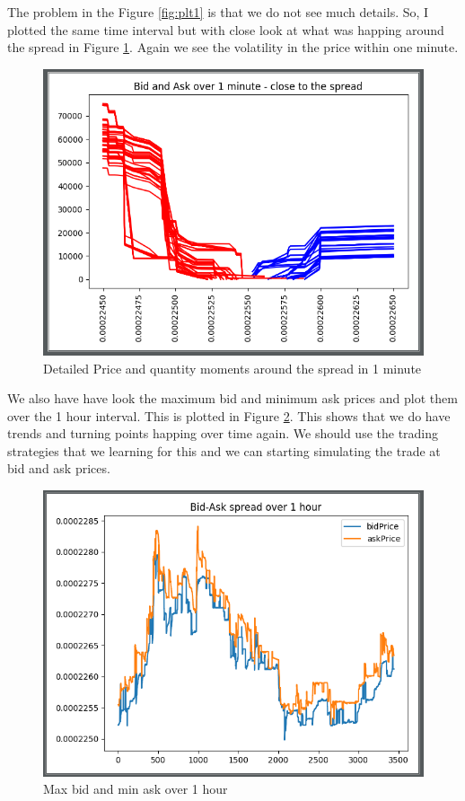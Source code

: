 \documentclass[12pt]{article}
\begin{document}
The problem in the Figure \ref{fig:plt1} is that we do not see much details. So, I plotted the same time interval but with close look at what was happing around the spread in Figure \ref{fig:plt2}. Again we see the volatility in the price within one minute.

\begin{figure}[h!]
	\centering
  \includegraphics[scale=0.5]{plot2.png}
  \caption{Detailed Price and quantity moments around the spread in 1 minute}
  \label{fig:plt2}
\end{figure}

We also have have look the maximum bid and minimum ask prices and plot them over the 1 hour interval. This is plotted in Figure \ref{fig:plt3}. This shows that we do have trends and turning points happing over time again. We should use the trading strategies that we learning for this and we can starting simulating the trade at bid and ask prices.

\begin{figure}[h!]
	\centering
  \includegraphics[scale=0.5]{plot3.png}
  \caption{Max bid and min ask over 1 hour}
  \label{fig:plt3}
\end{figure}
\end{document}
